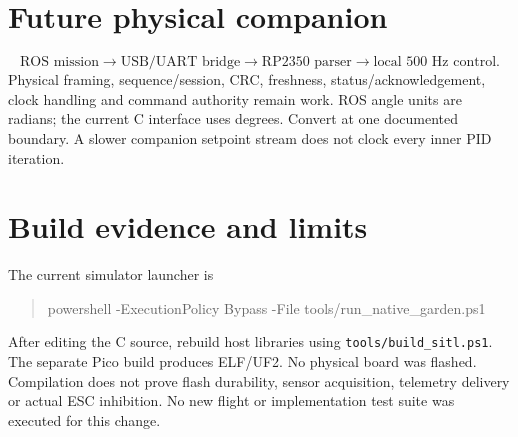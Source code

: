 \section{Future physical companion}
\begin{equation*}
\text{ROS mission}\to\text{USB/UART bridge}\to\text{RP2350 parser}
\to\text{local 500 Hz control}.
\end{equation*}
Physical framing, sequence/session, CRC, freshness, status/acknowledgement,
clock handling and command authority remain work. ROS angle units are radians;
the current C interface uses degrees. Convert at one documented boundary.
A slower companion setpoint stream does not clock every inner PID iteration.

\section{Build evidence and limits}
The current simulator launcher is
\begin{quote}\ttfamily\small
powershell -ExecutionPolicy Bypass -File tools/run\_native\_garden.ps1
\end{quote}
After editing the C source, rebuild host libraries using
\texttt{tools/build\_sitl.ps1}. The separate Pico build produces ELF/UF2.
No physical board was flashed. Compilation does not prove flash durability,
sensor acquisition, telemetry delivery or actual ESC inhibition. No new flight
or implementation test suite was executed for this change.

